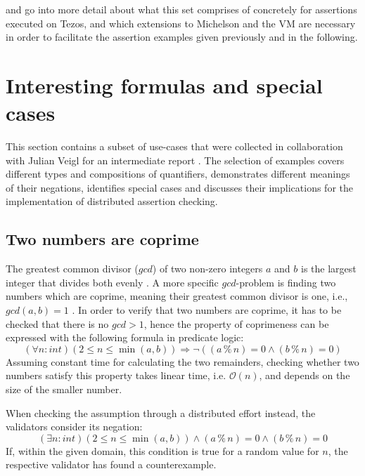  and  go into more detail about what this set comprises of concretely for assertions executed on Tezos, and which extensions to Michelson and the VM are necessary in order to facilitate the assertion examples given previously and in the following.

\section{Interesting formulas and special cases}\label{sec:examples}
This section contains a subset of use-cases that were collected in collaboration with Julian Veigl for an intermediate report \cite{bernhardt_veigel_2020}. The selection of examples covers different types and compositions of quantifiers, demonstrates different meanings of their negations, identifies special cases and discusses their implications for the implementation of distributed assertion checking.

\subsection{Two numbers are coprime}\label{sec:coprime}
The greatest common divisor ($gcd$) of two non-zero integers $a$ and $b$ is the largest integer that divides both evenly \cite{hardy2008introduction}. A more specific $gcd$-problem is finding two numbers which are coprime, meaning their greatest common divisor is one, i.e., $gcd(a, b) = 1$ \cite{hardy2008introduction}. In order to verify that two numbers are coprime, it has to be checked that there is no $gcd > 1$, hence the property of coprimeness can be expressed with the following formula in predicate logic:
\begin{equation}\label{eq:coprime-universial}
    (\forall n : int) (2 \le n \le \min(a,b)) \Rightarrow \neg((a \mathbin{\%} n) = 0 \land (b \mathbin{\%} n) = 0)
\end{equation}
Assuming constant time for calculating the two remainders, checking whether two numbers satisfy this property takes linear time, i.e. $\mathcal{O}(n)$, and depends on the size of the smaller number.

When checking the assumption through a distributed effort instead, the validators consider its negation:
\begin{equation}\label{eq:coprime-existential}
    (\exists n : int) (2 \le n \le \min(a,b)) \land (a \mathbin{\%} n) = 0 \land (b \mathbin{\%} n) = 0
\end{equation}
If, within the given domain, this condition is true for a random value for $n$, the respective validator has found a counterexample.

